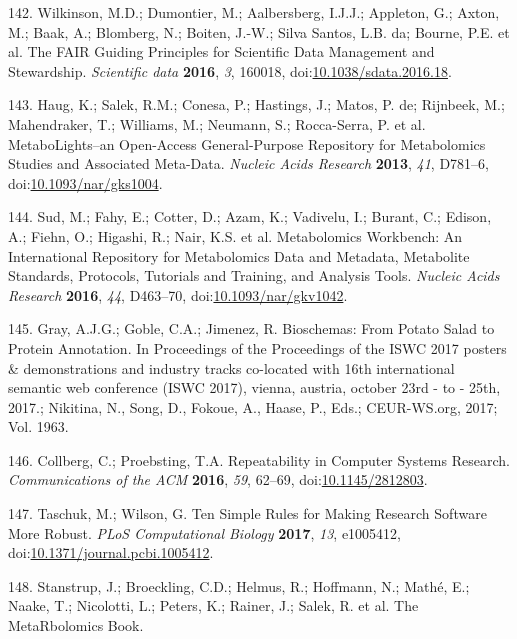\documentclass[]{article}
\begin{document}
\leavevmode\hypertarget{ref-wilkinson_2016}{}%
142. Wilkinson, M.D.; Dumontier, M.; Aalbersberg, I.J.J.; Appleton, G.; Axton, M.; Baak, A.; Blomberg, N.; Boiten, J.-W.; Silva Santos, L.B. da; Bourne, P.E. et al. The FAIR Guiding Principles for Scientific Data Management and Stewardship. \emph{Scientific data} \textbf{2016}, \emph{3}, 160018, doi:\href{https://doi.org/10.1038/sdata.2016.18}{10.1038/sdata.2016.18}.

\leavevmode\hypertarget{ref-haug_2013}{}%
143. Haug, K.; Salek, R.M.; Conesa, P.; Hastings, J.; Matos, P. de; Rijnbeek, M.; Mahendraker, T.; Williams, M.; Neumann, S.; Rocca-Serra, P. et al. MetaboLights--an Open-Access General-Purpose Repository for Metabolomics Studies and Associated Meta-Data. \emph{Nucleic Acids Research} \textbf{2013}, \emph{41}, D781--6, doi:\href{https://doi.org/10.1093/nar/gks1004}{10.1093/nar/gks1004}.

\leavevmode\hypertarget{ref-sud_2016}{}%
144. Sud, M.; Fahy, E.; Cotter, D.; Azam, K.; Vadivelu, I.; Burant, C.; Edison, A.; Fiehn, O.; Higashi, R.; Nair, K.S. et al. Metabolomics Workbench: An International Repository for Metabolomics Data and Metadata, Metabolite Standards, Protocols, Tutorials and Training, and Analysis Tools. \emph{Nucleic Acids Research} \textbf{2016}, \emph{44}, D463--70, doi:\href{https://doi.org/10.1093/nar/gkv1042}{10.1093/nar/gkv1042}.

\leavevmode\hypertarget{ref-gray_2017}{}%
145. Gray, A.J.G.; Goble, C.A.; Jimenez, R. Bioschemas: From Potato Salad to Protein Annotation. In Proceedings of the Proceedings of the ISWC 2017 posters \& demonstrations and industry tracks co-located with 16th international semantic web conference (ISWC 2017), vienna, austria, october 23rd - to - 25th, 2017.; Nikitina, N., Song, D., Fokoue, A., Haase, P., Eds.; CEUR-WS.org, 2017; Vol. 1963.

\leavevmode\hypertarget{ref-collberg_2016}{}%
146. Collberg, C.; Proebsting, T.A. Repeatability in Computer Systems Research. \emph{Communications of the ACM} \textbf{2016}, \emph{59}, 62--69, doi:\href{https://doi.org/10.1145/2812803}{10.1145/2812803}.

\leavevmode\hypertarget{ref-taschuk_2017}{}%
147. Taschuk, M.; Wilson, G. Ten Simple Rules for Making Research Software More Robust. \emph{PLoS Computational Biology} \textbf{2017}, \emph{13}, e1005412, doi:\href{https://doi.org/10.1371/journal.pcbi.1005412}{10.1371/journal.pcbi.1005412}.

\leavevmode\hypertarget{ref-stanstrup_website_nd}{}%
148. Stanstrup, J.; Broeckling, C.D.; Helmus, R.; Hoffmann, N.; Mathé, E.; Naake, T.; Nicolotti, L.; Peters, K.; Rainer, J.; Salek, R. et al. The MetaRbolomics Book.
\end{document}
